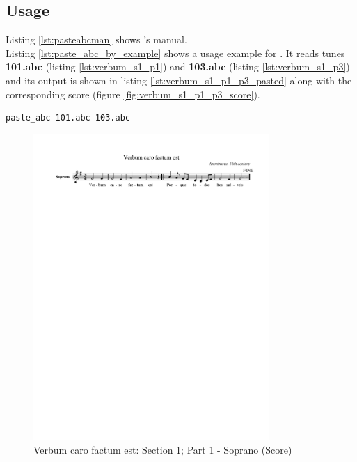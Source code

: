 \subsection*{Usage}

Listing \ref{lst:pasteabcman} shows \pasteabc{}'s manual.\\



Listing \ref{lst:paste_abc_by_example} shows a usage example for \pasteabc{}. It reads tunes
\textbf{101.abc} (listing \ref{lst:verbum_s1_p1}) and \textbf{103.abc} (listing
\ref{lst:verbum_s1_p3}) and its output is shown in listing \ref{lst:verbum_s1_p1_p3_pasted} along
with the corresponding score (figure \ref{fig:verbum_s1_p1_p3_score}).\\

\begin{lstlisting}[caption={\pasteabc{} by example},label={lst:paste_abc_by_example},captionpos=t,abovecaptionskip=-\medskipamount]
paste_abc 101.abc 103.abc
\end{lstlisting}



\vspace{-0.25cm}
\begin{figure}[H]
  \begin{center}
    \includegraphics[width=0.8\textwidth, clip=true, trim = 0mm 230mm 0mm 17mm]{img/101.pdf}
    \caption{Verbum caro factum est: Section 1; Part 1 - Soprano (Score)}
    \label{fig:verbum_s1_p1_score}
  \end{center}
\end{figure}

